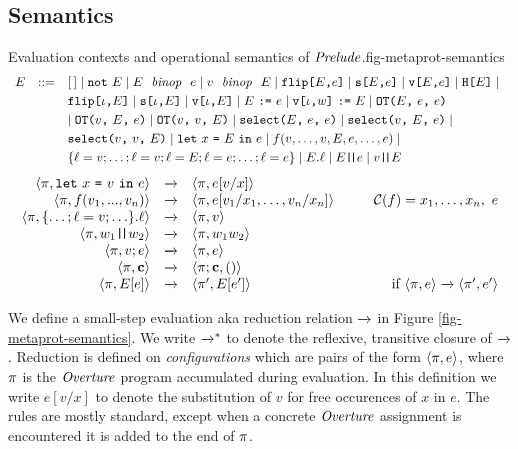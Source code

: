 \subsection{Semantics}

\begin{fpfig}[t]{Evaluation contexts and operational semantics of $\mathit{Prelude}$.}{fig-metaprot-semantics}
  {\small
    $$
    \begin{array}{rcl@{\hspace{3mm}}r}
      E &::=& [\,] \mid \enot\ E \mid E\ \bop\ e \mid v\ \bop\ E \mid  \flip{E}{e} \mid \secret{E}{e} \mid \view{E}{e} \mid \oracle{E} \mid  \\[1mm]
      & & \flip{\cid}{E} \mid \secret{\cid}{E} \mid \view{\cid}{E} \mid \send{E}{e} \mid \send{\view{\cid}{w}}{E} \mid \OT{E}{e}{e} \\[1mm]
      & & \mid \OT{v}{E}{e} \mid \OT{v}{v}{E} \mid \select{E}{e}{e} \mid \select{v}{E}{e} \mid \\[1mm]
      & & \select{v}{v}{E} \mid \elet{x}{E}{e} \mid f(v,\ldots,v,E,e,\ldots,e) \mid \\[1mm]
      & & \{ \flab = v;\ldots;\flab = v;\flab = E;\flab = e;\ldots;\flab = e \} \mid E.\flab \mid E\concat e \mid v \concat E
    \end{array}
    $$
    \medskip
    $$
    \begin{array}{rcl@{\hspace{10mm}}r}
      \config{\prog}{\elet{x}{v}{e}} &\redx& \config{\prog}{e[v/x]}\\
      \config{\prog}{f(v_1,...,v_n)} &\redx&
      \config{\prog}{e[v_1/x_1,\ldots,v_n/x_n]} & 
      \codebase(f) = x_1,\ldots,x_n,\ e\\
      \config{\prog}{\{\ldots; \flab = v; \ldots\}.\flab} &\redx&
      \config{\prog}{v}\\
      \config{\prog}{w_1\concat w_2} &\redx& \config{\prog}{w_1w_2}\\
      \config{\prog}{v;e} &\redx& \config{\prog}{e}\\
      \config{\prog}{\instr} &\redx& \config{\prog;\instr}{()}\\
      \config{\prog}{E[e]} &\redx& \config{\prog'}{E[e']} & \text{if}\ \config{\prog}{e} \redx \config{\prog'}{e'} 
    \end{array}
    $$
  }
\end{fpfig}

We define a small-step evaluation aka reduction relation $\xrightarrow{}$ in
Figure \ref{fig-metaprot-semantics}.  We write $\xrightarrow{}^{*}$ to denote the
reflexive, transitive closure of $\xrightarrow{}$. Reduction is defined on
\emph{configurations} which are pairs of the form $\langle \pi,e \rangle$,
where $\pi$ is the $\mathit{Overture}$ program accumulated during evaluation.
In this definition we write $e[v/x]$ to denote the substitution of $v$
for free occurences of $x$ in $e$. The rules are mostly standard,
except when a concrete $\mathit{Overture}$ assignment is encountered it is added
to the end of $\pi$.

